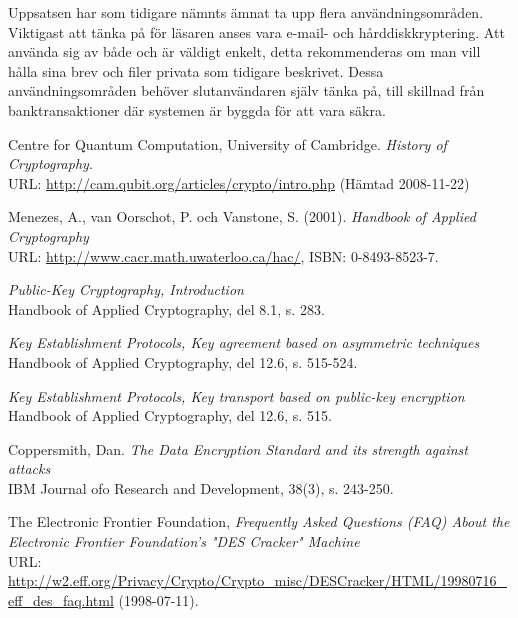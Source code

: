 \documentclass{article}
\begin{document}
Uppsatsen har som tidigare nämnts ämnat ta upp flera användningsområden. Viktigast att tänka på för läsaren anses vara e-mail- och hårddiskkryptering. Att använda sig av både och är väldigt enkelt, detta rekommenderas om man vill hålla sina brev och filer privata som tidigare beskrivet. Dessa användningsområden behöver slutanvändaren själv tänka på, till skillnad från banktransaktioner där systemen är byggda för att vara säkra.

\newpage

\begin{thebibliography}{99}

 Centre for Quantum Computation, University of Cambridge. \emph{History of Cryptography}.\\
URL: \url{http://cam.qubit.org/articles/crypto/intro.php} (Hämtad 2008-11-22)

 Menezes, A., van Oorschot, P. och Vanstone, S. (2001). \emph{Handbook of Applied Cryptography}\\
URL: \url{http://www.cacr.math.uwaterloo.ca/hac/}, ISBN: 0-8493-8523-7.

 \emph{Public-Key Cryptography, Introduction} \\
Handbook of Applied Cryptography, del 8.1, s. 283.

 \emph{Key Establishment Protocols, Key agreement based on asymmetric techniques} \\
Handbook of Applied Cryptography, del 12.6, s. 515-524.

 \emph{Key Establishment Protocols, Key transport based on public-key encryption} \\
Handbook of Applied Cryptography, del 12.6, s. 515.

 Coppersmith, Dan. \emph{The Data Encryption Standard and its strength against attacks} \\
IBM Journal ofo Research and Development, 38(3), s. 243-250.

 The Electronic Frontier Foundation, \emph{Frequently Asked Questions (FAQ) About the Electronic Frontier Foundation's "DES Cracker" Machine} \\
URL: \url{http://w2.eff.org/Privacy/Crypto/Crypto_misc/DESCracker/HTML/19980716_eff_des_faq.html} (1998-07-11).

\end{thebibliography}
\end{document}
